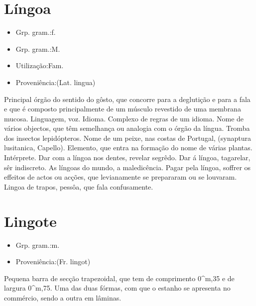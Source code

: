 \section{Língoa}
\begin{itemize}
\item {Grp. gram.:f.}
\end{itemize}
\begin{itemize}
\item {Grp. gram.:M.}
\end{itemize}
\begin{itemize}
\item {Utilização:Fam.}
\end{itemize}
\begin{itemize}
\item {Proveniência:(Lat. \textunderscore lingua\textunderscore )}
\end{itemize}
Principal órgão do sentido do gôsto, que concorre para a deglutição e para a fala e que é composto principalmente de um músculo revestido de uma membrana mucosa.
Linguagem, voz.
Idioma.
Complexo de regras de um idioma.
Nome de vários objectos, que têm semelhança ou analogia com o órgão da língua.
Tromba dos insectos lepidópteros.
Nome de um peixe, nas costas de Portugal, (\textunderscore synaptura lusitanica\textunderscore , Capello).
Elemento, que entra na formação do nome de várias plantas.
Intérprete.
\textunderscore Dar com a língoa nos dentes\textunderscore , revelar segrêdo.
\textunderscore Dar á língoa\textunderscore , tagarelar, sêr indiscreto.
\textunderscore As língoas do mundo\textunderscore , a maledicência.
\textunderscore Pagar pela língoa\textunderscore , soffrer os effeitos de actos ou acções, que levianamente se prepararam ou se louvaram.
\textunderscore Lingoa de trapos\textunderscore , pessôa, que fala confusamente.
\section{Lingote}
\begin{itemize}
\item {Grp. gram.:m.}
\end{itemize}
\begin{itemize}
\item {Proveniência:(Fr. \textunderscore lingot\textunderscore )}
\end{itemize}
Pequena barra de secção trapezoidal, que tem de comprimento 0^m,35 e de largura 0^m,75. Uma das duas fórmas, com que o estanho se apresenta no commércio, sendo a outra em lâminas.
